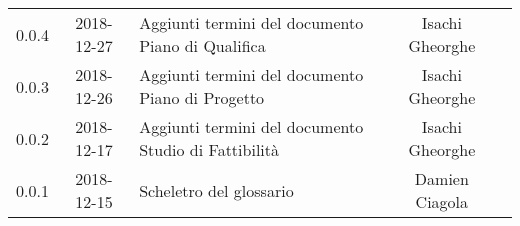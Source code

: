 {\begin{longtable}{ c c  C{4cm}  c  c }
		0.0.4 & 2018-12-27 & Aggiunti termini del documento Piano di Qualifica & Isachi Gheorghe &\reda{}\\
				
		0.0.3 & 2018-12-26 &Aggiunti termini del documento Piano di Progetto & Isachi Gheorghe & \reda{}\\
				
		0.0.2 & 2018-12-17 & Aggiunti termini del documento Studio di Fattibilità & Isachi Gheorghe &\reda{}\\
		
		0.0.1 & 2018-12-15 & Scheletro del glossario & Damien Ciagola & \reda{}\\
		
	\end{longtable}

}